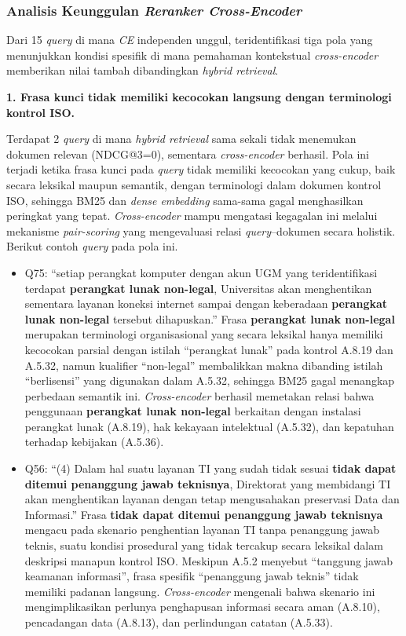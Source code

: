 \subsubsection{Analisis Keunggulan \textit{Reranker Cross-Encoder}}

Dari 15 \textit{query} di mana \textit{CE} independen unggul, teridentifikasi tiga pola yang menunjukkan kondisi spesifik di mana pemahaman kontekstual \textit{cross-encoder} memberikan nilai tambah dibandingkan \textit{hybrid retrieval}.

\textbf{1. Frasa kunci tidak memiliki kecocokan langsung dengan terminologi kontrol ISO.}

Terdapat 2 \textit{query} di mana \textit{hybrid retrieval} sama sekali tidak menemukan dokumen relevan (NDCG@3=0), sementara \textit{cross-encoder} berhasil. Pola ini terjadi ketika frasa kunci pada \textit{query} tidak memiliki kecocokan yang cukup, baik secara leksikal maupun semantik, dengan terminologi dalam dokumen kontrol ISO, sehingga BM25 dan \textit{dense embedding} sama-sama gagal menghasilkan peringkat yang tepat. \textit{Cross-encoder} mampu mengatasi kegagalan ini melalui mekanisme \textit{pair-scoring} yang mengevaluasi relasi \textit{query}--dokumen secara holistik. Berikut contoh \textit{query} pada pola ini.

\begin{itemize}
	\item Q75: ``setiap perangkat komputer dengan akun UGM yang teridentifikasi terdapat \textbf{perangkat lunak non-legal}, Universitas akan menghentikan sementara layanan koneksi internet sampai dengan keberadaan \textbf{perangkat lunak non-legal} tersebut dihapuskan.'' Frasa \textbf{perangkat lunak non-legal} merupakan terminologi organisasional yang secara leksikal hanya memiliki kecocokan parsial dengan istilah ``perangkat lunak'' pada kontrol A.8.19 dan A.5.32, namun kualifier ``non-legal'' membalikkan makna dibanding istilah ``berlisensi'' yang digunakan dalam A.5.32, sehingga BM25 gagal menangkap perbedaan semantik ini. \textit{Cross-encoder} berhasil memetakan relasi bahwa penggunaan \textbf{perangkat lunak non-legal} berkaitan dengan instalasi perangkat lunak (A.8.19), hak kekayaan intelektual (A.5.32), dan kepatuhan terhadap kebijakan (A.5.36).
	\item Q56: ``(4) Dalam hal suatu layanan TI yang sudah tidak sesuai \textbf{tidak dapat ditemui penanggung jawab teknisnya}, Direktorat yang membidangi TI akan menghentikan layanan dengan tetap mengusahakan preservasi Data dan Informasi.'' Frasa \textbf{tidak dapat ditemui penanggung jawab teknisnya} mengacu pada skenario penghentian layanan TI tanpa penanggung jawab teknis, suatu kondisi prosedural yang tidak tercakup secara leksikal dalam deskripsi manapun kontrol ISO. Meskipun A.5.2 menyebut ``tanggung jawab keamanan informasi'', frasa spesifik ``penanggung jawab teknis'' tidak memiliki padanan langsung. \textit{Cross-encoder} mengenali bahwa skenario ini mengimplikasikan perlunya penghapusan informasi secara aman (A.8.10), pencadangan data (A.8.13), dan perlindungan catatan (A.5.33).
\end{itemize}

